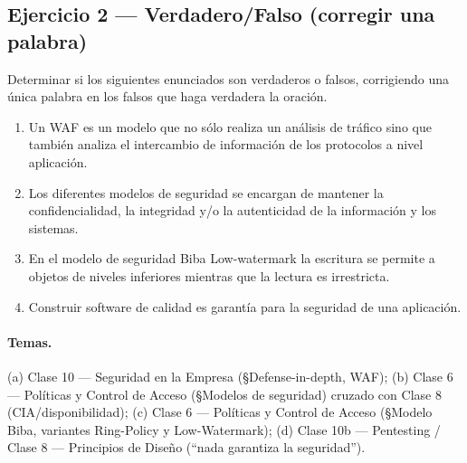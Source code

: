 \subsection{Ejercicio 2 — Verdadero/Falso (corregir una palabra)}

\begin{consigna}
Determinar si los siguientes enunciados son verdaderos o falsos, corrigiendo una única
palabra en los falsos que haga verdadera la oración.
\begin{enumerate}
  \item[a)] Un WAF es un modelo que no sólo realiza un análisis de tráfico sino que también
            analiza el intercambio de información de los protocolos a nivel aplicación.
  \item[b)] Los diferentes modelos de seguridad se encargan de mantener la confidencialidad,
            la integridad y/o la autenticidad de la información y los sistemas.
  \item[c)] En el modelo de seguridad Biba Low-watermark la escritura se permite a objetos de
            niveles inferiores mientras que la lectura es irrestricta.
  \item[d)] Construir software de calidad es garantía para la seguridad de una aplicación.
\end{enumerate}
\end{consigna}

\paragraph{Temas.}
(a) Clase 10 — Seguridad en la Empresa (\S Defense-in-depth, WAF); (b) Clase 6 — Políticas y
Control de Acceso (\S Modelos de seguridad) cruzado con Clase 8 (CIA/disponibilidad);
(c) Clase 6 — Políticas y Control de Acceso (\S Modelo Biba, variantes Ring-Policy y
Low-Watermark); (d) Clase 10b — Pentesting / Clase 8 — Principios de Diseño (``nada garantiza
la seguridad'').

